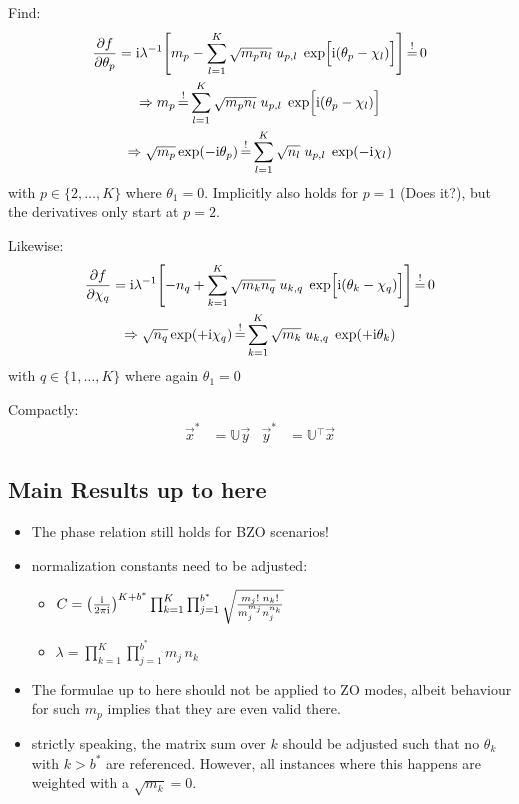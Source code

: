 \documentclass[
	english,
	a4paper,
	fontsize=10pt,
	parskip=half,
	titlepage=true,
	DIV=12,
	final
]{scrreprt}
\newcommand*{\Thus}{\ensuremath{\Rightarrow}\xspace}
\newcommand*{\transp}{\ensuremath{^\intercal}}
\newcommand*{\iunit}{\ensuremath{\mathrm{i}}}
\newcommand*{\equalCond}{  \mathop{=}\limits^!  }
\begin{document}
Find:
\begin{gather}
	\pdv{f}{\theta_p}
=
	\iunit \lambda^{-1}
	\qty[
		m_p
		-
		\sum_{l=1}^{K}
			\sqrt{m_p n_l} \; u_{p,l} \; \exp[ \Big. \iunit(\theta_p - \chi_l)]
	]
	\label{eqn:Jacobiantheta}
\equalCond
	0 \\
\Thus
	m_p
\equalCond
	\sum_{l=1}^{K}
		\sqrt{m_p n_l} \; u_{p,l} \; \exp[ \Big. \iunit(\theta_p - \chi_l) ] \\
\Thus
	\sqrt{m_p} \exp(-\iunit \theta_p)
\equalCond
	\sum_{l=1}^{K} \sqrt{n_l} \; u_{p,l} \; \exp(-\iunit\chi_l)
	\label{eqn:FourierLinkForward}
\end{gather}
with $p \in \{2, \ldots, K\}$ where $\theta_1 = 0$. Implicitly also holds for $p=1$ {\color{red}(Does it?)}, but the derivatives only start at $p=2$.

Likewise:
\begin{gather}
	\pdv{f}{\chi_q}
=
	\iunit\lambda^{-1}
	\qty[
		- n_q
		+
		\sum_{k=1}^{K}
			\sqrt{m_k n_q} \; u_{k,q} \; \exp[ \Big. \iunit(\theta_k - \chi_q) ]
	]
	\label{eqn:JacobianChi}
\equalCond
	0 \\
\Thus
	\sqrt{n_q} \exp(+\iunit \chi_q)
\equalCond
	\sum_{k=1}^{K}
	\sqrt{m_k} \; u_{k,q} \; \exp(+\iunit\theta_k)
	\label{eqn:FourierLinkBackward}
\end{gather}
with $q \in \{1, \ldots, K\}$ where again $\theta_1 = 0$

Compactly:
\begin{align}
	\vec{x}^{*} &= \mathbb{U} \vec{y}
&
	\vec{y}^{*} &= \mathbb{U}\transp \vec{x}
	\label{eqn:MatrixCondition}
\end{align}

\subsection{Main Results up to here}
\begin{itemize}
\item The phase relation still holds for BZO scenarios!
\item normalization constants need to be adjusted:
	\begin{itemize}
	\item $C =
	\qty(
		\frac{\iunit}{2\pi\iunit}
	)^{K + b^*}
	\prod_{k=1}^{K}
	\prod_{j=1}^{b^*}
		\sqrt{\frac
			{m_j! \; n_k!}
			{m_j^{m_j}  n_j^{n_k}}
		}$
	\item $\lambda =
	\prod_{k=1}^{K}
	\prod_{j=1}^{b^*}
		m_j \, n_k$
	\end{itemize}
\item The formulae up to here should not be applied to ZO modes, albeit behaviour for such $m_p$
	implies that they are even valid there.
\item strictly speaking, the matrix sum over $k$ should be adjusted such that no $\theta_k$ with
	$k > b^*$ are referenced. However, all instances where this happens are weighted with a
	$\sqrt{m_k} = 0$.
\end{itemize}
\end{document}

